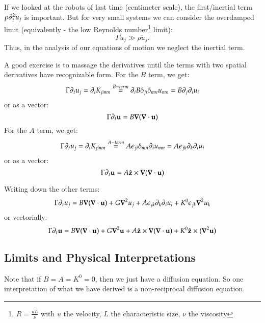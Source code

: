 If we looked at the robots of last time (centimeter scale), the first/inertial term $\rho \partial_t^2 u_j$ is important. But for very small systems we can consider the overdamped limit (equivalently - the low Reynolds number\footnote{$R = \frac{uL}{\nu}$ with $u$ the velocity, $L$ the characteristic size, $\nu$ the viscosity} limit):
\begin{equation}
    \Gamma \dot{u}_j \gg \rho \ddot{u}_j.
\end{equation}
Thus, in the analysis of our equations of motion we neglect the inertial term.

A good exercise is to massage the derivatives until the terms with two spatial derivatives have recognizable form. For the $B$ term, we get:
\begin{equation}
    \Gamma \partial_t u_j = \partial_i K_{jimn} \stackrel{B-term}{=} \partial_i B \delta_{ji}\delta_{mn}u_{mn} = B\partial_j \partial_i u_i
\end{equation}
or as a vector:
\begin{equation}
    \Gamma \p_t \v{u} = B\nabla(\nabla \cdot \v{u})
\end{equation}
For the $A$ term, we get:
\begin{equation}
    \Gamma \partial_t u_j = \partial_i K_{jimn} \stackrel{A-term}{=} A\epsilon_{ji}\delta_{mn}\partial_i u_{mn} = A\epsilon_{jk}\partial_k \partial_i u_i
\end{equation}
or as a vector:
\begin{equation}
    \Gamma \p_t \v{u} = A\zhat \times \nabla(\nabla \cdot \v{u})
\end{equation}

Writing down the other terms:
\begin{equation}
    \Gamma \p_t u_j = B\nabla(\nabla \cdot \v{u}) + G\nabla^2u_j + A\e_{jk}\p_k \p_i u_i + K^0\e_{jk}\nabla^2 u_k 
\end{equation}
or vectorially:
\begin{equation}
    \Gamma \p_t \v{u} =B\nabla(\nabla \cdot \v{u}) + G\nabla^2\v{u} + A\zhat \times \nabla(\nabla \cdot \v{u}) + K^0 \zhat \times (\nabla^2 \v{u})
\end{equation}

\subsection{Limits and Physical Interpretations}
Note that if $B = A = K^0 = 0$, then we just have a diffusion equation. So one interpretation of what we have derived is a non-reciprocal diffusion equation.


